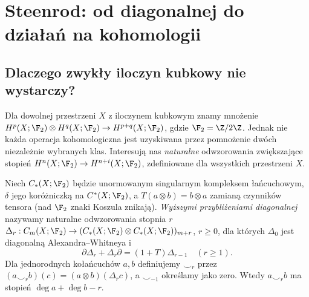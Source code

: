\section{Steenrod: od diagonalnej do działań na kohomologii}
\subsection*{Dlaczego zwykły iloczyn kubkowy nie wystarczy?}
Dla dowolnej przestrzeni $X$ z iloczynem kubkowym
znamy mnożenie $H^p(X;\F_2)\otimes H^q(X;\F_2)
\to H^{p+q}(X;\F_2)$, gdzie $\F_2=\Z/2\Z$.
Jednak nie każda operacja kohomologiczna jest
uzyskiwana przez pomnożenie dwóch niezależnie
wybranych klas. Interesują nas \emph{naturalne}
odwzorowania zwiększające stopień
$H^n(X;\F_2)\to H^{n+i}(X;\F_2)$,
zdefiniowane dla wszystkich przestrzeni $X$.

\begin{definicja}
Niech $C_*(X;\F_2)$ będzie unormowanym singularnym
kompleksem łańcuchowym, $\delta$ jego koróżniczką
na $C^*(X;\F_2)$, a $T(a\otimes b)=b\otimes a$
zamianą czynników tensora (nad $\F_2$ znaki
Koszula znikają). \emph{Wyższymi przybliżeniami diagonalnej}
nazywamy naturalne odwzorowania stopnia $r$
\(\Delta_r:C_m(X;\F_2)\to
(C_*(X;\F_2)\otimes C_*(X;\F_2))_{m+r}\),
$r\ge0$, dla których $\Delta_0$ jest diagonalną
Alexandra--Whitneya i
\[
\partial\Delta_r+\Delta_r\partial=(1+T)\Delta_{r-1}
\quad(r\ge1).
\]
Dla jednorodnych kołańcuchów $a,b$ definiujemy
$\smile_r$ przez
$(a\smile_r b)(c)=(a\otimes b)(\Delta_r c)$,
a $\smile_{-1}$ określamy jako zero.
Wtedy $a\smile_r b$ ma stopień
$\deg a+\deg b-r$.
\end{definicja}

